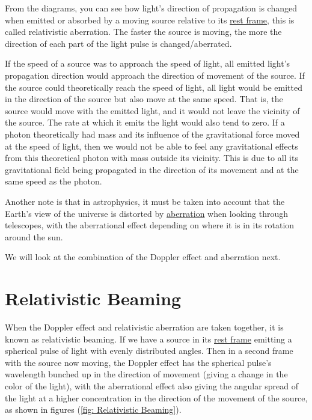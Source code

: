 From the diagrams, you can see how light's direction of propagation is changed when emitted or absorbed by a moving source relative to its \hyperlink{def-proper-frame}{rest frame}, this is called relativistic aberration. The faster the source is moving, the more the direction of each part of the light pulse is changed/aberrated.


If the speed of a source was to approach the speed of light, all emitted light's propagation direction would approach the direction of movement of the source.
If the source could theoretically reach the speed of light, all light would be emitted in the direction of the source but also move at the same speed.
That is, the source would move with the emitted light, and it would not leave the vicinity of the source.
The rate at which it emits the light would also tend to zero.
If a photon theoretically had mass and its influence of the gravitational force moved at the speed of light, then we would not be able to feel any gravitational effects from this theoretical photon with mass outside its vicinity.
This is due to all its gravitational field being propagated in the direction of its movement and at the same speed as the photon.

Another note is that in astrophysics, it must be taken into account that the Earth's view of the universe is distorted by \hyperlink{def-aberration}{aberration} when looking through telescopes, with the aberrational effect depending on where it is in its rotation around the sun.

We will look at the combination of the Doppler effect and aberration next.


\section{Relativistic Beaming} \label{sect: Intro Relativistic Beaming}

When the Doppler effect and relativistic aberration are taken together, it is known as relativistic beaming.
If we have a source in its \hyperlink{def-proper-frame}{rest frame} emitting a spherical pulse of light with evenly distributed angles.
Then in a second frame with the source now moving, the Doppler effect has the spherical pulse's wavelength bunched up in the direction of movement (giving a change in the color of the light), with the aberrational effect also giving the angular spread of the light at a higher concentration in the direction of the movement of the source, as shown in figures (\ref{fig: Relativistic Beaming}).

